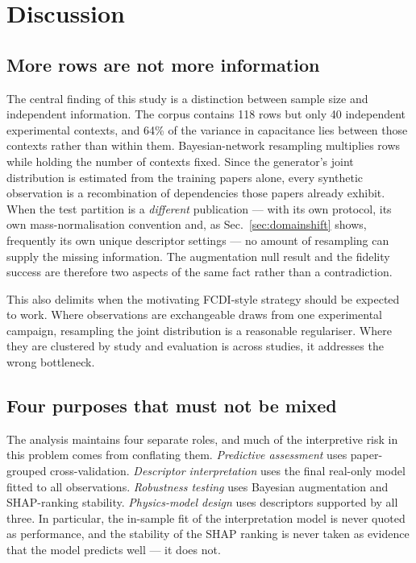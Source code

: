 \section{Discussion}\label{sec:discussion}

\subsection{More rows are not more information}
The central finding of this study is a distinction between sample size and independent
information. The corpus contains 118 rows but only 40 independent experimental contexts,
and 64\% of the variance in capacitance lies between those contexts rather than
within them. Bayesian-network resampling multiplies rows while holding the number of contexts
fixed. Since the generator's joint distribution is estimated from the training papers alone,
every synthetic observation is a recombination of dependencies those papers already exhibit.
When the test partition is a \emph{different} publication --- with its own protocol, its own
mass-normalisation convention and, as Sec.~\ref{sec:domainshift} shows, frequently its own
unique descriptor settings --- no amount of resampling can supply the missing information.
The augmentation null result and the fidelity success are therefore two aspects of the same
fact rather than a contradiction.

This also delimits when the motivating FCDI-style strategy should be expected to work. Where
observations are exchangeable draws from one experimental campaign, resampling the joint
distribution is a reasonable regulariser. Where they are clustered by study and evaluation is
across studies, it addresses the wrong bottleneck.

\subsection{Four purposes that must not be mixed}
The analysis maintains four separate roles, and much of the interpretive risk in this problem
comes from conflating them. \emph{Predictive assessment} uses paper-grouped
cross-validation. \emph{Descriptor interpretation} uses the final real-only model fitted to
all observations. \emph{Robustness testing} uses Bayesian augmentation and SHAP-ranking
stability. \emph{Physics-model design} uses descriptors supported by all three. In
particular, the in-sample fit of the interpretation model is never quoted as performance, and
the stability of the SHAP ranking is never taken as evidence that the model predicts well ---
it does not.

